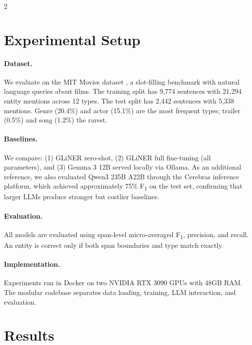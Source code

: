 \documentclass[11pt]{article}
\newcommand{\fone}{F\textsubscript{1}}
\begin{document}
\begin{multicols}{2}

\section{Experimental Setup}

\paragraph{Dataset.}
We evaluate on the MIT Movies dataset \citep{liu2019movie}, a slot-filling benchmark with natural language queries about films. The training split has 9{,}774 sentences with 21{,}294 entity mentions across 12 types. The test split has 2{,}442 sentences with 5{,}338 mentions. Genre (20.4\%) and actor (15.1\%) are the most frequent types; trailer (0.5\%) and song (1.2\%) the rarest.

\paragraph{Baselines.}
We compare: (1) GLiNER zero-shot, (2) GLiNER full fine-tuning (all parameters), and (3) Gemma 3 12B served locally via Ollama. As an additional reference, we also evaluated Qwen3 235B A22B through the Cerebras inference platform, which achieved approximately 75\% \fone{} on the test set, confirming that larger LLMs produce stronger but costlier baselines.

\paragraph{Evaluation.}
All models are evaluated using span-level micro-averaged \fone{}, precision, and recall. An entity is correct only if both span boundaries and type match exactly.

\paragraph{Implementation.}
Experiments run in Docker on two NVIDIA RTX 3090 GPUs with 48GB RAM. The modular codebase separates data loading, training, LLM interaction, and evaluation.

\section{Results}


\end{multicols}
\end{document}

